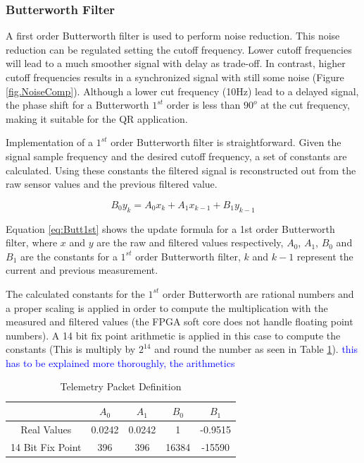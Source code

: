 \documentclass{article}
\newcommand\todo[1]{\textcolor{blue}{#1}} %
\begin{document}
\subsubsection{Butterworth Filter}

A first order Butterworth filter is used to perform noise reduction. This noise reduction can be regulated setting the cutoff frequency. Lower cutoff frequencies will lead to a much smoother signal with delay as trade-off. In contrast, higher cutoff frequencies results in a synchronized signal with still some noise (Figure \ref{fig.NoiseComp}). Although a lower cut frequency (10Hz) lead to a delayed signal, the phase shift for a Butterworth $1^{st}$ order is less than $90^{o}$ at the cut frequency, making it suitable for the QR application. 


Implementation of a $1^{st}$ order Butterworth filter is straightforward. Given the signal sample frequency and the desired cutoff frequency, a set of constants are calculated. Using these constants the filtered signal is reconstructed out from the raw sensor values and the previous filtered value.

\begin{equation}
	 B_0 y_k = A_0 x_k + A_1 x_{k-1} + B_1 y_{k-1}
	 \label{eq:Butt1st}
\end{equation}

Equation \ref{eq:Butt1st} shows the update formula for a 1st order Butterworth filter, where $x$ and $y$ are the raw and filtered values respectively, $A_0$, $A_1$, $B_0$ and $B_1$ are the constants for a $1^{st}$ order Butterworth filter, $k$ and $k-1$ represent the current and previous measurement.

The calculated constants for the $1^{st}$ order Butterworth are rational numbers and a proper scaling is applied in order to compute the multiplication with the measured and filtered values (the FPGA soft core does not handle floating point numbers). A 14 bit fix point arithmetic is applied in this case to compute the constants (This is multiply by $2^{14}$ and round the number as seen in Table \ref{tbl:ButtConstants}). \todo{this has to be explained more thoroughly, the arithmetics}

\begin{table}[ht]
\centering
\caption{Telemetry Packet Definition}
\begin{tabular}{|c|c|c|c|c|}
\hline 
 & $A_0$ & $A_1$ & $B_0$ & $B_1$ \\ 
\hline 
Real Values & 0.0242 & 0.0242 & 1 & -0.9515 \\ 
\hline 
14 Bit Fix Point & 396 & 396 & 16384 & -15590 \\ 
\hline 
\end{tabular}
\label{tbl:ButtConstants}
\end{table}
\end{document}
